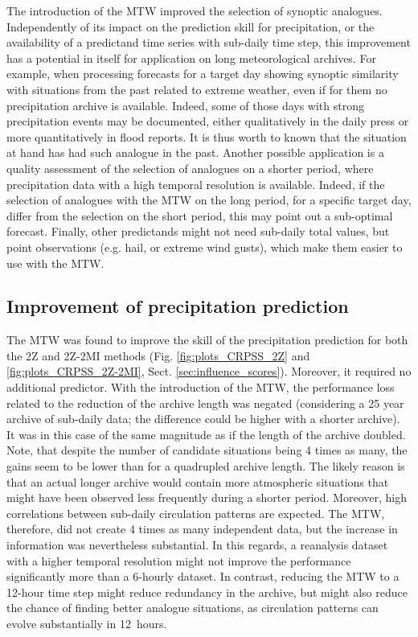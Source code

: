 \documentclass[hess, manuscript]{copernicus}
\begin{document}
	The introduction of the MTW improved the selection of synoptic analogues. Independently of its impact on the prediction skill for precipitation, or the availability of a predictand time series with sub-daily time step, this improvement has a potential in itself for application on long meteorological archives. For example, when processing forecasts for a target day showing synoptic similarity with situations from the past related to extreme weather, even if for them no precipitation archive is available. Indeed, some of those days with strong precipitation events may be documented, either qualitatively in the daily press or more quantitatively in flood reports. It is thus worth to known that the situation at hand has had such analogue in the past. Another possible application is a quality assessment of the selection of analogues on a shorter period, where precipitation data with a high temporal resolution is available. Indeed, if the selection of analogues with the MTW on the long period, for a specific target day, differ from the selection on the short period, this may point out a sub-optimal forecast. Finally, other predictands might not need sub-daily total values, but point observations (e.g. hail, or extreme wind gusts), which make them easier to use with the MTW.
	
	
	\subsection{Improvement of precipitation prediction}
	
	The MTW was found to improve the skill of the precipitation prediction for both the 2Z and 2Z-2MI methods (Fig. \ref{fig:plots_CRPSS_2Z} and \ref{fig:plots_CRPSS_2Z-2MI}, Sect. \ref{sec:influence_scores}). Moreover, it required no additional predictor. With the introduction of the MTW, the performance loss related to the reduction of the archive length was negated (considering a 25 year archive of sub-daily data; the difference could be higher with a shorter archive). It was in this case of the same magnitude as if the length of the archive doubled. Note, that despite the number of candidate situations being 4 times as many, the gains seem to be lower than for a quadrupled archive length. The likely reason is that an actual longer archive would contain more atmospheric situations that might have been observed less frequently during a shorter period. Moreover, high correlations between sub-daily circulation patterns are expected. The MTW, therefore, did not create 4 times as many independent data, but the increase in information was nevertheless substantial. In this regards, a reanalysis dataset with a higher temporal resolution might not improve the performance significantly more than a 6-hourly dataset. In contrast, reducing the MTW to a 12-hour time step might reduce redundancy in the archive, but might also reduce the chance of finding better analogue situations, as circulation patterns can evolve substantially in 12~hours.
	
\end{document}
